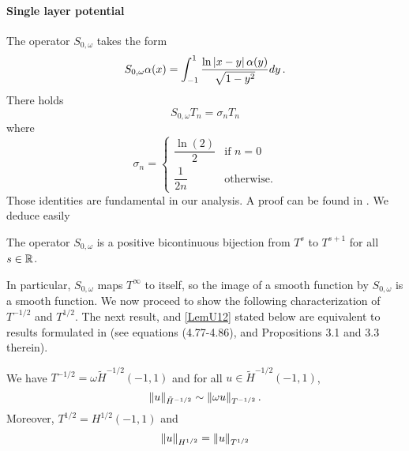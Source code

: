 \documentclass[a4paper]{article}
\begin{document}
\paragraph{Single layer potential} The operator $S_{0,\omega}$ takes the form 
\[S_{0,\omega} \alpha(x) = \int_{-1}^{1} \frac{\ln \left\lvert x - y \right\rvert \alpha(y)}{\sqrt{1 - y^2}}dy \,.\]
There holds 
\begin{equation}
\label{explicitEigs}
S_{0,\omega} T_n = \sigma_n T_n
\end{equation}
where 
\[\sigma_n = \begin{cases}
\dfrac{\ln(2)}{2} & \text{if } n=0\\
\dfrac{1}{2n} & \text{otherwise}.
\end{cases}\]
Those identities are fundamental in our analysis. A proof can be found in \cite{} . We deduce easily
\begin{Lem}
	The operator $S_{0,\omega}$ is a positive bicontinuous bijection from $T^s$ to $T^{s+1}$ for all $s \in \mathbb{R}$. 
	\label{SomegaMapProp}
\end{Lem}
In particular, $S_{0,\omega}$ maps $T^{\infty}$ to itself, so the image of a smooth function by $S_{0,\omega}$ is a smooth function. We now proceed to show the following characterization of $T^{-1/2}$ and $T^{1/2}$. The next result, and \autoref{LemU12} stated below are equivalent to results formulated in \cite{jerez2012explicit} (see equations (4.77-4.86), and Propositions 3.1 and 3.3 therein).
\begin{Lem}
	\label{LemmaT-1/2}
	We have $T^{-1/2} = \omega\tilde{H}^{-1/2}(-1,1)$ and for all $u \in \tilde{H}^{-1/2}(-1,1)$,
	\[\left\|u\right\|_{\tilde{H}^{-1/2}} \sim \left\|\omega u\right\|_{T^{-1/2}}.\] 
	Moreover, $T^{1/2} = H^{1/2}(-1,1)$ and 
	\[\left\|u\right\|_{H^{1/2}} = \left\|u\right\|_{T^{1/2}}\]
\end{Lem}
\end{document}
